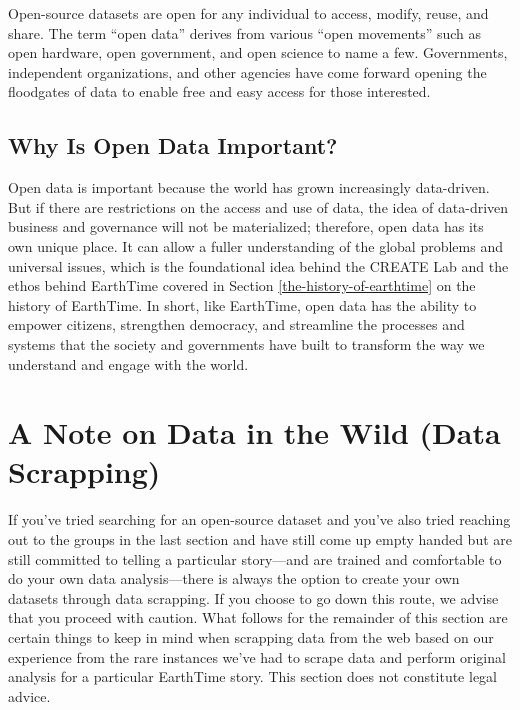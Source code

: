 \documentclass[
]{book}
\begin{document}
Open-source datasets are open for any individual to access, modify, reuse, and share. The term ``open data'' derives from various ``open movements'' such as open hardware, open government, and open science to name a few. Governments, independent organizations, and other agencies have come forward opening the floodgates of data to enable free and easy access for those interested.

\hypertarget{why-is-open-data-important}{%
\subsection*{Why Is Open Data Important?}\label{why-is-open-data-important}}


Open data is important because the world has grown increasingly data-driven. But if there are restrictions on the access and use of data, the idea of data-driven business and governance will not be materialized; therefore, open data has its own unique place. It can allow a fuller understanding of the global problems and universal issues, which is the foundational idea behind the CREATE Lab and the ethos behind EarthTime covered in Section \ref{the-history-of-earthtime} on the history of EarthTime. In short, like EarthTime, open data has the ability to empower citizens, strengthen democracy, and streamline the processes and systems that the society and governments have built to transform the way we understand and engage with the world.

\hypertarget{a-note-on-data-in-the-wild-data-scrapping}{%
\section{A Note on Data in the Wild (Data Scrapping)}\label{a-note-on-data-in-the-wild-data-scrapping}}

If you've tried searching for an open-source dataset and you've also tried reaching out to the groups in the last section and have still come up empty handed but are still committed to telling a particular story---and are trained and comfortable to do your own data analysis---there is always the option to create your own datasets through data scrapping. If you choose to go down this route, we advise that you proceed with caution. What follows for the remainder of this section are certain things to keep in mind when scrapping data from the web based on our experience from the rare instances we've had to scrape data and perform original analysis for a particular EarthTime story. This section does not constitute legal advice.
\end{document}
